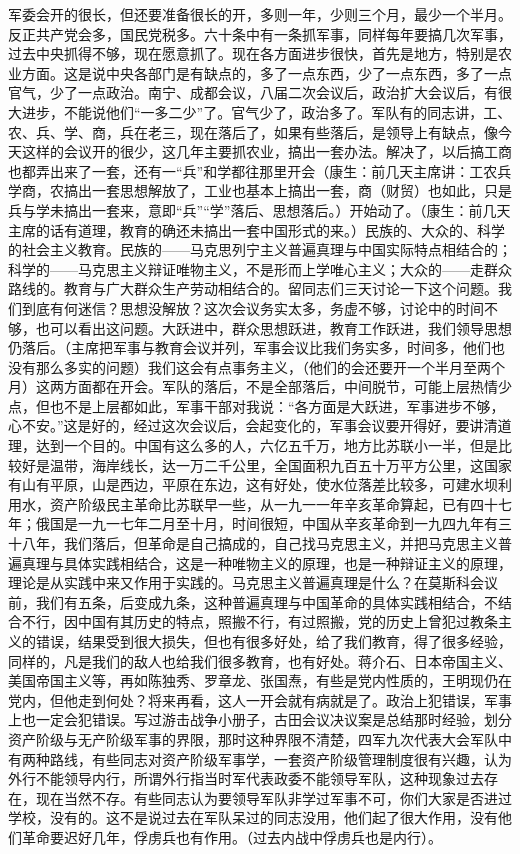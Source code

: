 军委会开的很长，但还要准备很长的开，多则一年，少则三个月，最少一个半月。反正共产党会多，国民党税多。六十条中有一条抓军事，同样每年要搞几次军事，过去中央抓得不够，现在愿意抓了。现在各方面进步很快，首先是地方，特别是农业方面。这是说中央各部门是有缺点的，多了一点东西，少了一点东西，多了一点官气，少了一点政治。南宁、成都会议，八届二次会议后，政治扩大会议后，有很大进步，不能说他们“一多二少”了。官气少了，政治多了。军队有的同志讲，工、农、兵、学、商，兵在老三，现在落后了，如果有些落后，是领导上有缺点，像今天这样的会议开的很少，这几年主要抓农业，搞出一套办法。解决了，以后搞工商也都弄出来了一套，还有一“兵”和学都往那里开会（康生：前几天主席讲：工农兵学商，农搞出一套思想解放了，工业也基本上搞出一套，商（财贸）也如此，只是兵与学未搞出一套来，意即“兵”“学”落后、思想落后。）开始动了。（康生：前几天主席的话有道理，教育的确还未搞出一套中国形式的来。）民族的、大众的、科学的社会主义教育。民族的——马克思列宁主义普遍真理与中国实际特点相结合的；科学的——马克思主义辩证唯物主义，不是形而上学唯心主义；大众的——走群众路线的。教育与广大群众生产劳动相结合的。留同志们三天讨论一下这个问题。我们到底有何迷信？思想没解放？这次会议务实太多，务虚不够，讨论中的时间不够，也可以看出这问题。大跃进中，群众思想跃进，教育工作跃进，我们领导思想仍落后。（主席把军事与教育会议并列，军事会议比我们务实多，时间多，他们也没有那么多实的问题）我们这会有点事务主义，（他们的会还要开一个半月至两个月）这两方面都在开会。军队的落后，不是全部落后，中间脱节，可能上层热情少点，但也不是上层都如此，军事干部对我说：“各方面是大跃进，军事进步不够，心不安。”这是好的，经过这次会议后，会起变化的，军事会议要开得好，要讲清道理，达到一个目的。中国有这么多的人，六亿五千万，地方比苏联小一半，但是比较好是温带，海岸线长，达一万二千公里，全国面积九百五十万平方公里，这国家有山有平原，山是西边，平原在东边，这有好处，使水位落差比较多，可建水坝利用水，资产阶级民主革命比苏联早一些，从一九一一年辛亥革命算起，已有四十七年；俄国是一九一七年二月至十月，时间很短，中国从辛亥革命到一九四九年有三十八年，我们落后，但革命是自己搞成的，自己找马克思主义，并把马克思主义普遍真理与具体实践相结合，这是一种唯物主义的原理，也是一种辩证主义的原理，理论是从实践中来又作用于实践的。马克思主义普遍真理是什么？在莫斯科会议前，我们有五条，后变成九条，这种普遍真理与中国革命的具体实践相结合，不结合不行，因中国有其历史的特点，照搬不行，有过照搬，党的历史上曾犯过教条主义的错误，结果受到很大损失，但也有很多好处，给了我们教育，得了很多经验，同样的，凡是我们的敌人也给我们很多教育，也有好处。蒋介石、日本帝国主义、美国帝国主义等，再如陈独秀、罗章龙、张国焘，有些是党内性质的，王明现仍在党内，但他走到何处？将来再看，这人一开会就有病就是了。政治上犯错误，军事上也一定会犯错误。写过游击战争小册子，古田会议决议案是总结那时经验，划分资产阶级与无产阶级军事的界限，那时这种界限不清楚，四军九次代表大会军队中有两种路线，有些同志对资产阶级军事学，一套资产阶级管理制度很有兴趣，认为外行不能领导内行，所谓外行指当时军代表政委不能领导军队，这种现象过去存在，现在当然不存。有些同志认为要领导军队非学过军事不可，你们大家是否进过学校，没有的。这不是说过去在军队呆过的同志没用，他们起了很大作用，没有他们革命要迟好几年，俘虏兵也有作用。（过去内战中俘虏兵也是内行）。


